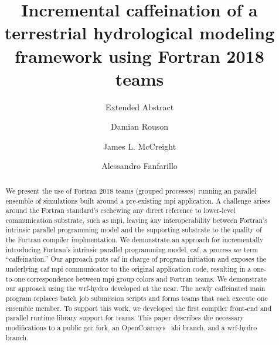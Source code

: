 \documentclass[sigconf, authordraft]{acmart}
\begin{document}
\title{Incremental caffeination of a terrestrial hydrological modeling framework using Fortran 2018 teams}
\subtitle{Extended Abstract}


\author{Damian Rouson}
\renewcommand{\shortauthors}{D. Rouson et al.}

\author{James L. McCreight}

\author{Alessandro Fanfarillo}

\begin{abstract}
We present the use of Fortran 2018 teams (grouped processes) running an parallel ensemble
of simulations built around a pre-existing \gls{mpi} application.  A challenge arises
around the Fortran standard's eschewing any direct reference to lower-level communication
substrate, such as \gls{mpi}, leaving any interoperability between Fortran's intrinsic
parallel programming model and the supporting substrate to the quality of the Fortran
compiler implmentation.  We demonstrate an approach for incrementally introducing
Fortran's intrinsic parallel programming model, \gls{caf}, a process we term
``caffeination.''  Our approach puts \gls{caf} in charge of program initiation and
exposes the underlying \gls{caf} \gls{mpi} communicator to the original application
code,  resulting in a one-to-one correspondence between \gls{mpi} group colors and Fortran
teams.  We demonstrate our approach using the \gls{wrf-hydro} developed at the \gls{ncar}.
The newly caffeinated main program replaces batch job submission scripts and forms teams
that each execute one ensemble member.  To support this work, we developed the first
compiler front-end and parallel runtime library support for teams.  This paper describes
the necessary modifications to a public \gls{gcc} fork, an
OpenCoarrays~\cite{fanfarillo2014opencoarrays} \gls{abi} branch, and a \gls{wrf-hydro}
branch.
\end{abstract}
\end{document}
